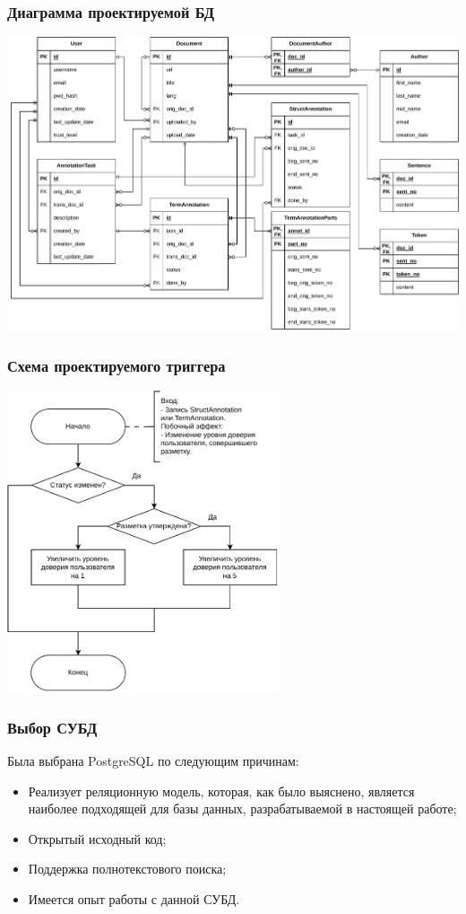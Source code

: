 \documentclass{beamer}
\begin{document}
\begin{frame}
    \frametitle{Диаграмма проектируемой БД}
    \centering
	\includegraphics[width=\textwidth]{diag/erd-v3.pdf}
\end{frame}

\begin{frame}
    \frametitle{Схема проектируемого триггера}
    \centering
	\includegraphics[width=0.6\textwidth]{diag/trig-v4.pdf}
\end{frame}

\begin{frame}
    \frametitle{Выбор СУБД}
    Была выбрана PostgreSQL по следующим причинам:
    \begin{itemize}
        \item Реализует реляционную модель, которая, как было выяснено, является наиболее подходящей для базы данных, разрабатываемой в настоящей работе;
        \item Открытый исходный код;
        \item Поддержка полнотекстового поиска;
        \item Имеется опыт работы с данной СУБД.
    \end{itemize}
\end{frame}
\end{document}

